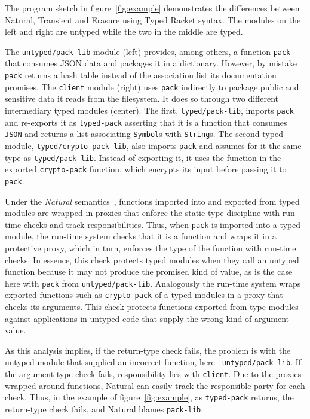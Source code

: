 The program sketch in figure~\ref{fig:example} demonstrates the
differences between Natural, Transient and Erasure using Typed Racket
syntax.  The modules on the left and right are untyped while the two
in the middle are typed.

The \texttt{untyped/pack-lib} module (left) provides, among others, a function
\texttt{pack} that consumes JSON data and packages it in a dictionary. However,
by mistake \texttt{pack} returns a hash table instead of the association list
its documentation promises.  The \texttt{client} module (right) uses
\texttt{pack} indirectly to package public and sensitive data it reads from the
filesystem. It does so through two different intermediary typed modules
(center). The first, {\tt typed/pack-lib}, imports \texttt{pack} and re-exports
it as \texttt{typed-pack} asserting that it is a function that consumes {\tt
JSON} and returns a list associating {\tt Symbol}s with {\tt String}s. The
second typed module, {\tt typed/crypto-pack-lib}, also imports \texttt{pack} and
assumes for it the same type as {\tt typed/pack-lib}. Instead of exporting it,
it uses the function in the exported {\tt crypto-pack} function, which encrypts
its input before passing it to \texttt{pack}.

Under the {\it Natural\/} semantics~\cite{tf-popl-2008,tfffgksst-snapl-2017},
functions imported into and exported from typed modules are wrapped in proxies
that enforce the static type discipline with run-time checks and track
responsibilities. Thus, when \texttt{pack} is imported into a typed module, the
run-time system checks that it is a function and wraps it in a protective proxy,
which in turn, enforces the type of the function with run-time checks.  In
essence, this check protects typed modules when they call an untyped function
because it may not produce the promised kind of value, as is the case here with
{\tt pack} from {\tt untyped/pack-lib}. Analogously the run-time system wraps
exported functions such as {\tt crypto-pack} of a typed modules in a proxy that
checks its arguments.  This check protects functions exported from type modules
against applications in untyped code that supply the wrong kind of argument
value.

As this analysis implies, if the return-type check fails, the problem is with
the untyped module that supplied an incorrect function, here {\tt
untyped/pack-lib}. If the argument-type check fails, responsibility lies with
{\tt client}. Due to the proxies wrapped around functions, Natural can easily
track the responsible party for each check. Thus, in the example of
figure~\ref{fig:example}, as \texttt{typed-pack} returns, the return-type check
fails, and Natural blames \texttt{pack-lib}.

